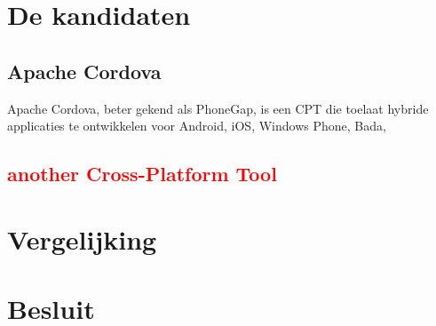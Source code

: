 \documentclass[a4paper]{IEEEconf}
\newcommand{\anotherCPT}{\textcolor{red}{another Cross-Platform Tool}}
\begin{document}
\section{De kandidaten}

\subsection{Apache Cordova}

Apache Cordova, beter gekend als PhoneGap, is een CPT die toelaat hybride applicaties te ontwikkelen voor Android, iOS, Windows Phone, Bada, 

\subsection{\anotherCPT}

\section{Vergelijking}

\section{Besluit}

\printbibliography
\end{document}
